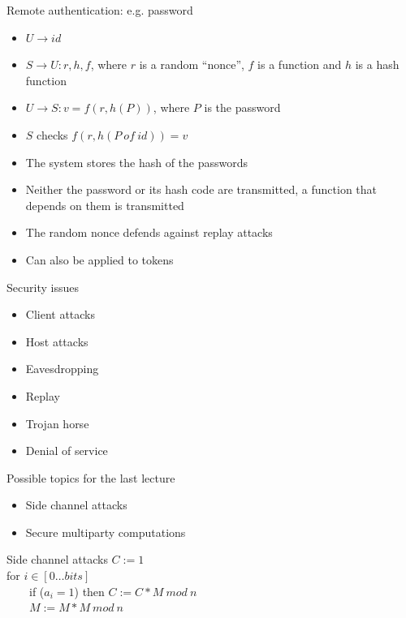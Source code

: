 \documentclass{beamer}
\begin{document}
\begin{frame}{Remote authentication: e.g. password}
  \begin{itemize}
    \item $U \rightarrow id$
    \item $S \rightarrow U: r, h, f$, where $r$ is a random ``nonce'', $f$ is a function and $h$ is a hash function 
    \item $U \rightarrow S: v = f(r, h(P))$, where $P$ is the password
    \item $S$ checks $f(r, h(P\ of\ id)) = v$
    \item The system stores the hash of the passwords
    \item Neither the password or its hash code are transmitted, a function that depends on them is transmitted
    \item The random nonce defends against replay attacks
    \item Can also be applied to tokens
  \end{itemize}
\end{frame}

\begin{frame}{Security issues}
  \begin{itemize}
    \item Client attacks
    \item Host attacks
    \item Eavesdropping
    \item Replay
    \item Trojan horse
    \item<2> Denial of service
  \end{itemize}
\end{frame}


\begin{frame}{Possible topics for the last lecture}
  \begin{itemize}
    \item Side channel attacks
    \item Secure multiparty computations
  \end{itemize}
\end{frame}

\begin{frame}{Side channel attacks}
      $C:=1$\\
      for $i \in [0\dots bits]$\\
      \ \ \ \ if ($a_i=1$) then $C:= C * M\ mod\ n$\\
      \ \ \ \ $M:= M*M\ mod\ n$
\end{frame}
\end{document}
